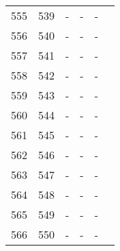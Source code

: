 \documentclass[10pt]{article}
\begin{document}
\begin{longtable}{llllll}
  555 & 539 & - & - & - &  \\ 
  556 & 540 & - & - & - &  \\ 
  557 & 541 & - & - & - &  \\ 
  558 & 542 & - & - & - &  \\ 
  559 & 543 & - & - & - &  \\ 
  560 & 544 & - & - & - &  \\ 
  561 & 545 & - & - & - &  \\ 
  562 & 546 & - & - & - &  \\ 
  563 & 547 & - & - & - &  \\ 
  564 & 548 & - & - & - &  \\ 
  565 & 549 & - & - & - &  \\ 
  566 & 550 & - & - & - &  \\ 
   \hline
\hline
\end{longtable}
\end{document}
